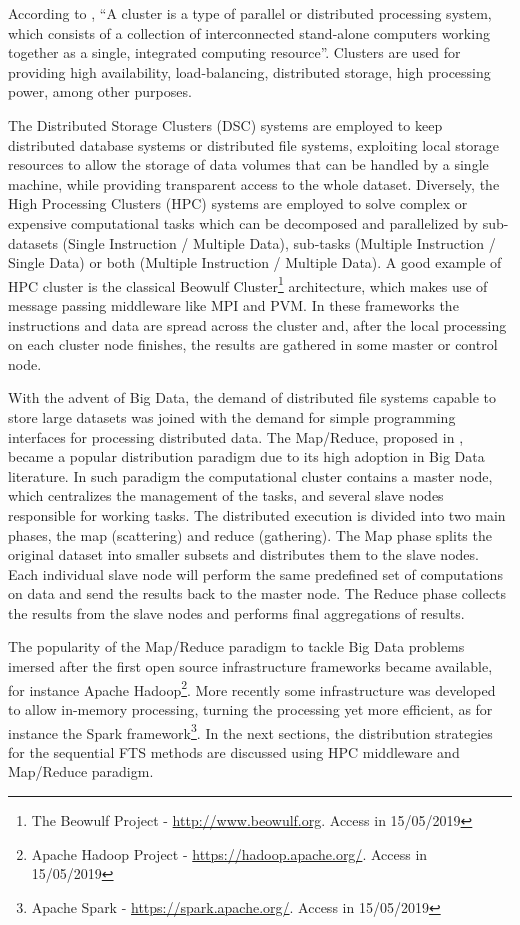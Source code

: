 According to \cite{Baker1999}, ``A cluster is a type of parallel or distributed processing system, which consists of a collection of interconnected stand-alone computers working together as a single, integrated computing resource''. Clusters are used for providing high availability, load-balancing, distributed storage, high processing power, among other purposes.

The Distributed Storage Clusters (DSC) systems are employed to keep distributed database systems or distributed file systems, exploiting local storage resources to allow the storage of data volumes that can be handled by a single machine, while providing transparent access to the whole dataset. Diversely, the High Processing Clusters (HPC) systems are employed to solve complex or expensive computational tasks which can be decomposed and parallelized by sub-datasets (Single Instruction / Multiple Data), sub-tasks (Multiple Instruction / Single Data) or both (Multiple Instruction / Multiple Data). A good example of HPC cluster is the classical Beowulf Cluster\footnote{The Beowulf Project - \url{http://www.beowulf.org}. Access in 15/05/2019} architecture, which makes use of message passing middleware like MPI and PVM. In these frameworks the instructions and data are spread across the cluster and, after the local processing on each cluster node finishes, the results are gathered in some master or control node. 

With the advent of Big Data, the demand of distributed file systems capable to store large datasets was joined with the demand for simple programming interfaces for processing distributed data. The Map/Reduce, proposed in \cite{Dean2008}, became a popular distribution paradigm due to its high adoption in Big Data literature. In such paradigm the computational cluster contains a master node, which centralizes the management of the tasks, and several slave nodes responsible for working tasks. The distributed execution is divided into two main phases, the map (scattering) and reduce (gathering). The Map phase splits the original dataset into smaller subsets and distributes them to the slave nodes. Each individual slave node will perform the same predefined set of computations on data and send the results back to the master node. The Reduce phase collects the results from the slave nodes and performs final aggregations of results.

The popularity of the Map/Reduce paradigm to tackle Big Data problems imersed after the first open source infrastructure frameworks became available, for instance Apache Hadoop\footnote{Apache Hadoop Project - \url{https://hadoop.apache.org/}. Access in 15/05/2019}. More recently some infrastructure was developed to allow in-memory processing, turning the processing yet more efficient, as for instance the Spark framework\footnote{Apache Spark - \url{https://spark.apache.org/}. Access in 15/05/2019}. In the next sections, the distribution strategies for the sequential FTS methods are discussed using HPC middleware and Map/Reduce paradigm.


